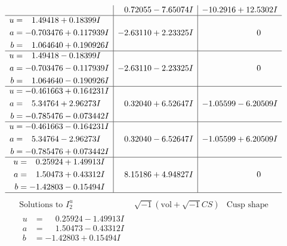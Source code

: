 \documentclass[1p]{elsarticle_modified}
\theoremstyle{definition}
\newcommand{\I}{\sqrt{-1}}
\begin{document}
$$\begin{array}{c|c|c}
 & \phantom{-}0.72055 - 7.65074 I & -10.2916 + 12.5302 I \\ \hline\begin{aligned}
u &= \phantom{-}1.49418 + 0.18399 I \\
a &= -0.703476 + 0.117939 I \\
b &= \phantom{-}1.064640 + 0.190926 I\end{aligned}
 & -2.63110 + 2.23325 I & \phantom{-0.000000 } 0 \\ \hline\begin{aligned}
u &= \phantom{-}1.49418 - 0.18399 I \\
a &= -0.703476 - 0.117939 I \\
b &= \phantom{-}1.064640 - 0.190926 I\end{aligned}
 & -2.63110 - 2.23325 I & \phantom{-0.000000 } 0 \\ \hline\begin{aligned}
u &= -0.461663 + 0.164231 I \\
a &= \phantom{-}5.34764 + 2.96273 I \\
b &= -0.785476 - 0.073442 I\end{aligned}
 & \phantom{-}0.32040 + 6.52647 I & -1.05599 - 6.20509 I \\ \hline\begin{aligned}
u &= -0.461663 - 0.164231 I \\
a &= \phantom{-}5.34764 - 2.96273 I \\
b &= -0.785476 + 0.073442 I\end{aligned}
 & \phantom{-}0.32040 - 6.52647 I & -1.05599 + 6.20509 I \\ \hline\begin{aligned}
u &= \phantom{-}0.25924 + 1.49913 I \\
a &= \phantom{-}1.50473 + 0.43312 I \\
b &= -1.42803 - 0.15494 I\end{aligned}
 & \phantom{-}8.15186 + 4.94827 I & \phantom{-0.000000 } 0\\
 \hline 
 \end{array}$$\newpage$$\begin{array}{c|c|c}  
\text{Solutions to }I^u_{2}& \I (\text{vol} + \sqrt{-1}CS) & \text{Cusp shape}\\
 \hline 
\begin{aligned}
u &= \phantom{-}0.25924 - 1.49913 I \\
a &= \phantom{-}1.50473 - 0.43312 I \\
b &= -1.42803 + 0.15494 I\end{aligned}

\end{array}$$
\end{document}
